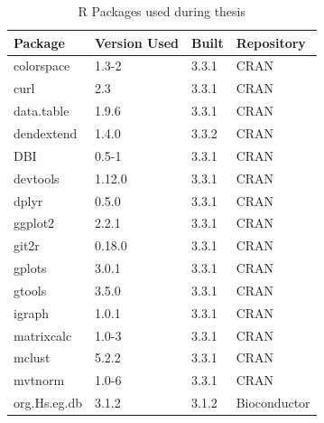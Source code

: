 \begin{longtable}{llll}
\caption{R Packages used during thesis}
\label{tab:computers_r_packages}
\\
\multicolumn{1}{l}{\bfseries Package}      & \multicolumn{1}{l}{\bfseries Version Used} & \multicolumn{1}{l}{\bfseries Built} & \multicolumn{1}{l}{\bfseries Repository}      \\
\hline  \rowcolor{black!10}
colorspace   & 1.3-2          & 3.3.1 & \gls{CRAN}            \\
\rowcolor{black!5}
curl         & 2.3            & 3.3.1 & \gls{CRAN}            \\
\rowcolor{black!10}
data.table   & 1.9.6          & 3.3.1 & \gls{CRAN}            \\
\rowcolor{black!5}
dendextend   & 1.4.0          & 3.3.2 & \gls{CRAN}            \\
\rowcolor{black!10}
DBI          & 0.5-1          & 3.3.1 & \gls{CRAN}            \\
\rowcolor{black!5}
devtools     & 1.12.0         & 3.3.1 & \gls{CRAN}            \\
\rowcolor{black!10}
dplyr        & 0.5.0          & 3.3.1 & \gls{CRAN}            \\
\rowcolor{black!5}
ggplot2      & 2.2.1          & 3.3.1 & \gls{CRAN}            \\
\rowcolor{black!10}
git2r        & 0.18.0         & 3.3.1 & \gls{CRAN}            \\
\rowcolor{black!5}
gplots       & 3.0.1          & 3.3.1 & \gls{CRAN}            \\
\rowcolor{black!10}
gtools       & 3.5.0          & 3.3.1 & \gls{CRAN}            \\
\rowcolor{black!5}
igraph       & 1.0.1          & 3.3.1 & \gls{CRAN}            \\
\rowcolor{black!10}
matrixcalc   & 1.0-3          & 3.3.1 & \gls{CRAN}            \\
\rowcolor{black!5}
mclust       & 5.2.2          & 3.3.1 & \gls{CRAN}            \\
\rowcolor{black!10}
mvtnorm      & 1.0-6          & 3.3.1 & \gls{CRAN}            \\
\rowcolor{black!5}
org.Hs.eg.db & 3.1.2          & 3.1.2 & Bioconductor    \\

\end{longtable}
